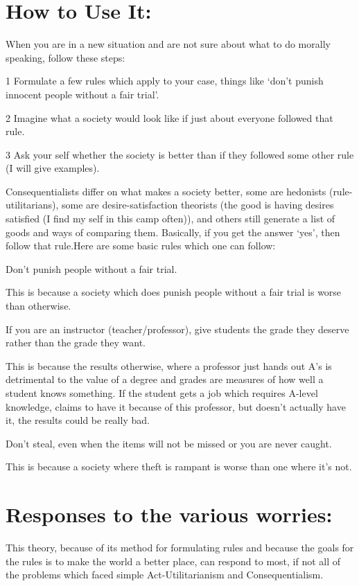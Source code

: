 \section{How to Use It:}
When you are in a new situation and are not sure about what to do morally speaking, follow these steps:
\begin{earg}
    \item[1] Formulate a few rules which apply to your case, things like ‘don’t punish innocent people without a fair trial’.
    \item[2] Imagine what a society would look like if just about everyone followed that rule.
    \item[3] Ask your self whether the society is better than if they followed some other rule (I will give examples).
\end{earg}
Consequentialists differ on what makes a society better, some are hedonists (rule-utilitarians), some are desire-satisfaction theorists (the good is having desires satisfied (I find my self in this camp often)), and others still generate a list of goods and ways of comparing them. Basically, if you get the answer ‘yes’, then follow that rule.Here are some basic rules which one can follow: 

\begin{center}
Don’t punish people without a fair trial. 
\end{center}
This is because a society which does punish people without a fair trial is worse than otherwise. 
\begin{center}
If you are an instructor (teacher/professor), give students the grade they deserve rather than the grade they want. 
\end{center}
This is because the results otherwise, where a professor just hands out A’s is detrimental to the value of a degree and grades are measures of how well a student knows something. If the student gets a job which requires A-level knowledge, claims to have it because of this professor, but doesn’t actually have it, the results could be really bad. 
\begin{center}
Don’t steal, even when the items will not be missed or you are never caught. 
\end{center}
This is because a society where theft is rampant is worse than one where it’s not.

\section{Responses to the various worries:}
This theory, because of its method for formulating rules and because the goals for the rules is to make the world a better place, can respond to most, if not all of the problems which faced simple Act-Utilitarianism and Consequentialism. 

